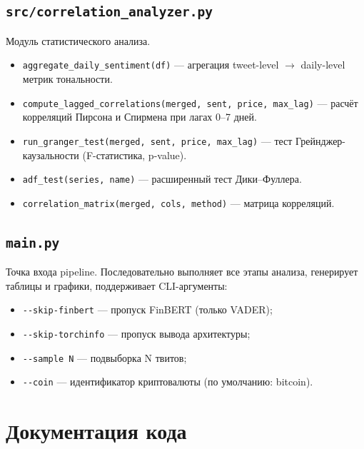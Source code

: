 \documentclass[a4paper,12pt]{article}
\begin{document}
\subsection{\texttt{src/correlation\_analyzer.py}}

Модуль статистического анализа.

\begin{itemize}
  \item \texttt{aggregate\_daily\_sentiment(df)} --- агрегация tweet-level $\rightarrow$
        daily-level метрик тональности.
  \item \texttt{compute\_lagged\_correlations(merged, sent, price, max\_lag)} ---
        расчёт корреляций Пирсона и Спирмена при лагах 0--7 дней.
  \item \texttt{run\_granger\_test(merged, sent, price, max\_lag)} ---
        тест Грейнджер-каузальности (F-статистика, p-value).
  \item \texttt{adf\_test(series, name)} --- расширенный тест Дики--Фуллера.
  \item \texttt{correlation\_matrix(merged, cols, method)} --- матрица корреляций.
\end{itemize}

\subsection{\texttt{main.py}}

Точка входа pipeline. Последовательно выполняет все этапы анализа,
генерирует таблицы и графики, поддерживает CLI-аргументы:

\begin{itemize}
  \item \texttt{-{}-skip-finbert} --- пропуск FinBERT (только VADER);
  \item \texttt{-{}-skip-torchinfo} --- пропуск вывода архитектуры;
  \item \texttt{-{}-sample N} --- подвыборка N твитов;
  \item \texttt{-{}-coin} --- идентификатор криптовалюты (по умолчанию: bitcoin).
\end{itemize}


\section{Документация кода}
\end{document}
